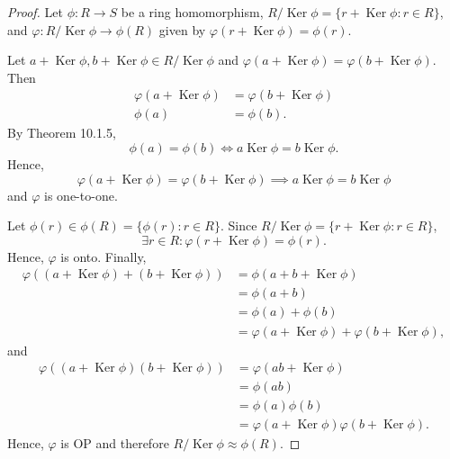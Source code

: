 \documentclass{article}
\newtheorem{theorem}{Theorem}[section]
\theoremstyle{definition}
\DeclareMathOperator{\Ker}{Ker}
\begin{document}
\begin{proof}
     Let $\phi:R\to S$ be a ring homomorphism, $R/\Ker\phi=\{r+\Ker\phi:r\in R\}$, and $\varphi:R/\Ker\phi\to\phi(R)$ given by $\varphi(r+\Ker\phi)=\phi(r)$.
     
     Let $a+\Ker\phi,b+\Ker\phi\in R/\Ker\phi$ and $\varphi(a+\Ker\phi)=\varphi(b+\Ker\phi)$. Then
     \begin{align*}
         \varphi(a+\Ker\phi)&=\varphi(b+\Ker\phi) \\
         \phi(a)&=\phi(b).
     \end{align*}
     By Theorem 10.1.5,
     \begin{equation*}
         \phi(a)=\phi(b) \iff a\Ker\phi=b\Ker\phi.
     \end{equation*}
     Hence, 
     \begin{equation*}
         \varphi(a+\Ker\phi)=\varphi(b+\Ker\phi) \implies a\Ker\phi=b\Ker\phi
     \end{equation*}
     and $\varphi$ is one-to-one.
     
     Let $\phi(r)\in\phi(R)=\{\phi(r):r\in R\}$. Since $R/\Ker\phi=\{r+\Ker\phi:r\in R\}$,
     \begin{equation*}
         \exists r \in R: \varphi(r+\Ker\phi)=\phi(r).
     \end{equation*}
     Hence, $\varphi$ is onto. Finally,
     \begin{align*}
         \varphi((a+\Ker\phi)+(b+\Ker\phi))&=\phi(a+b+\Ker\phi) \\
         &=\phi(a+b) \\
         &=\phi(a)+\phi(b) \\
         &=\varphi(a+\Ker\phi)+\varphi(b+\Ker\phi),
     \end{align*}
     and
     \begin{align*}
         \varphi((a+\Ker\phi)(b+\Ker\phi))&=\varphi(ab+\Ker\phi) \\
         &=\phi(ab) \\
         &=\phi(a)\phi(b) \\
         &=\varphi(a+\Ker\phi)\varphi(b+\Ker\phi).
     \end{align*}
     Hence, $\varphi$ is OP and therefore $R/\Ker\phi\approx\phi(R)$.
\end{proof}

\noindent{}
\end{document}
